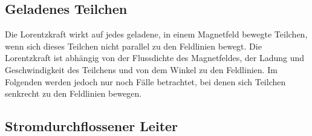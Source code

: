 




%
%	





\subsection{Geladenes Teilchen}

Die Lorentzkraft wirkt auf jedes geladene, in einem Magnetfeld bewegte Teilchen, wenn sich dieses Teilchen nicht parallel zu den Feldlinien bewegt. Die Lorentzkraft ist abhängig von der Flussdichte des Magnetfeldes, der Ladung und Geschwindigkeit des Teilchens und von dem Winkel zu den Feldlinien. Im Folgenden werden jedoch nur noch Fälle betrachtet, bei denen sich Teilchen senkrecht zu den Feldlinien bewegen.


\subsection{Stromdurchflossener Leiter}

